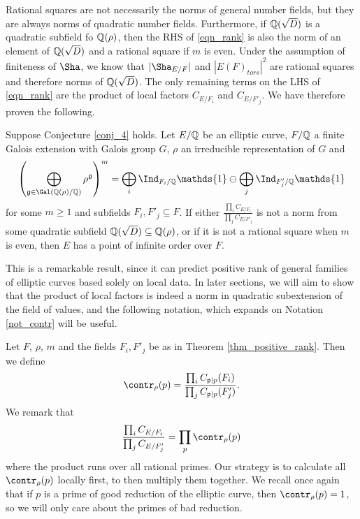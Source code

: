 Rational squares are not necessarily the norms of general number fields, but they are always norms of quadratic number fields. Furthermore, if $\mathbb{Q}(\sqrt{D})$ is a quadratic subfield fo $\mathbb{Q}(\rho)$, then the RHS of \eqref{eqn_rank} is also the norm of an element of $\mathbb{Q}(\sqrt{D})$ and a rational square if $m$ is even. Under the assumption of finiteness of $\Sha$, we know that $|\Sha_{E/F}|$ and $|E(F)_{tors}|^2$ are rational squares and therefore norms of $\mathbb{Q}(\sqrt{D})$. The only remaining terms on the LHS of \eqref{eqn_rank} are the product of local factors $C_{E/F_i}$ and $C_{E/F'_j}$. We have therefore proven the following.

\begin{thm}\cite[Theorem 33]{DEW1} \label{thm_positive_rank}
    Suppose Conjecture \ref*{conj_4} holds. Let $E/\mathbb{Q}$ be an elliptic curve, $F/\mathbb{Q}$ a finite Galois extension with Galois group $G$, $\rho$ an irreducible representation of $G$ and  
    $$\left(\bigoplus_{\mathfrak{g}\in\Gal(\QQ(\rho)/\QQ)}\rho^{\mathfrak{g}}\right)^m=\bigoplus_i\Ind_{F_i/\QQ}\mathds{1}\ominus\bigoplus_j\Ind_{F'_j/\QQ}\mathds{1}$$
    for some $m\geq 1$ and subfields $F_i,F'_j\subseteq F$. If either $\frac{\prod_i C_{E/F_i}}{\prod_j C_{E/F'_j}}$ is not a norm from some quadratic subfield $\mathbb{Q}(\sqrt{D})\subseteq\mathbb{Q}(\rho)$, or if it is not a rational square when $m$ is even, then $E$ has a point of infinite order over $F$.
\end{thm}

This is a remarkable result, since it can predict positive rank of general families of elliptic curves based solely on local data. In later sections, we will aim to show that the product of local factors is indeed a norm in quadratic subextension of the field of values, and the following notation, which expands on Notation \ref*{not_contr} will be useful.

\begin{notation} \label{not_total_contr}
    Let $F$, $\rho$, $m$ and the fields $F_i,F'_j$ be as in Theorem \ref*{thm_positive_rank}. Then we define
    $$\contr_\rho(p)=\frac{\prod_i C_{\pp\mid p}(F_i)}{\prod_j C_{\pp\mid p}(F'_j)}.$$
    We remark that 
    $$\frac{\prod_i C_{E/F_i}}{\prod_j C_{E/F'_j}}=\prod_p\contr_\rho(p)$$
    where the product runs over all rational primes. Our strategy is to calculate all $\contr_\rho(p)$ locally first, to then multiply them together. We recall once again that if $p$ is a prime of good reduction of the elliptic curve, then $\contr_\rho(p)=1$, so we will only care about the primes of bad reduction.
\end{notation}

